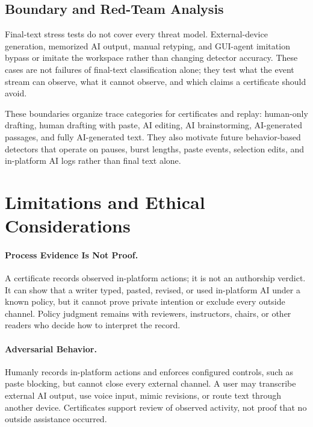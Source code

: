 \documentclass[11pt]{article}
\begin{document}
\subsection{Boundary and Red-Team Analysis}
\label{sec:redteam}

Final-text stress tests do not cover every threat model. External-device generation, memorized AI output, manual retyping, and GUI-agent imitation bypass or imitate the workspace rather than changing detector accuracy. These cases are not failures of final-text classification alone; they test what the event stream can observe, what it cannot observe, and which claims a certificate should avoid.

These boundaries organize trace categories for certificates and replay: human-only drafting, human drafting with paste, AI editing, AI brainstorming, AI-generated passages, and fully AI-generated text. They also motivate future behavior-based detectors that operate on pauses, burst lengths, paste events, selection edits, and in-platform AI logs rather than final text alone.

\section{Limitations and Ethical Considerations}
\label{sec:limitations}

\paragraph{Process Evidence Is Not Proof.}
A certificate records observed in-platform actions; it is not an authorship verdict. It can show that a writer typed, pasted, revised, or used in-platform AI under a known policy, but it cannot prove private intention or exclude every outside channel. Policy judgment remains with reviewers, instructors, chairs, or other readers who decide how to interpret the record.

\paragraph{Adversarial Behavior.}
Humanly records in-platform actions and enforces configured controls, such as paste blocking, but cannot close every external channel. A user may transcribe external AI output, use voice input, mimic revisions, or route text through another device. Certificates support review of observed activity, not proof that no outside assistance occurred.
\end{document}
